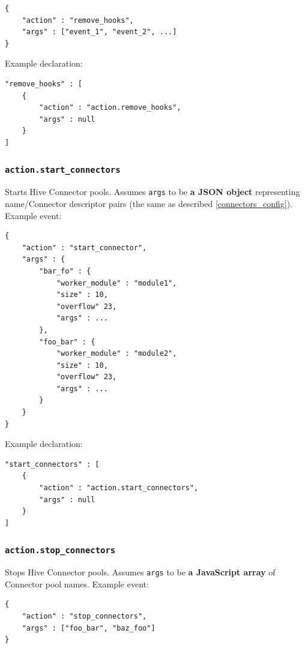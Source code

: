 \documentclass[a4paper]{article}
\begin{document}
\begin{verbatim}
{
    "action" : "remove_hooks",
    "args" : ["event_1", "event_2", ...]
}
\end{verbatim}




\noindent
Example declaration:

\begin{verbatim}
"remove_hooks" : [
    {
        "action" : "action.remove_hooks",
        "args" : null
    }
]
\end{verbatim}
\subsubsection{\texttt{action.start\_connectors}}
\label{sec-8-3-8}

Starts Hive Connector pools. Assumes \texttt{args} to be \textbf{a JSON object} representing name/Connector descriptor pairs (the same as described \ref{connectors_config}). Example event:


\begin{verbatim}
{
    "action" : "start_connector",
    "args" : {
        "bar_fo" : {
            "worker_module" : "module1",
            "size" : 10,
            "overflow" 23,
            "args" : ...
        },
        "foo_bar" : {
            "worker_module" : "module2",
            "size" : 10,
            "overflow" 23,
            "args" : ...
        }
    }
}
\end{verbatim}




\noindent
Example declaration:

\begin{verbatim}
"start_connectors" : [
    {
        "action" : "action.start_connectors",
        "args" : null
    }
]
\end{verbatim}
\subsubsection{\texttt{action.stop\_connectors}}
\label{sec-8-3-9}

Stops Hive Connector pools. Assumes \texttt{args} to be \textbf{a JavaScript array} of Connector pool names. Example event:


\begin{verbatim}
{
    "action" : "stop_connectors",
    "args" : ["foo_bar", "baz_foo"]
}
\end{verbatim}
\end{document}
